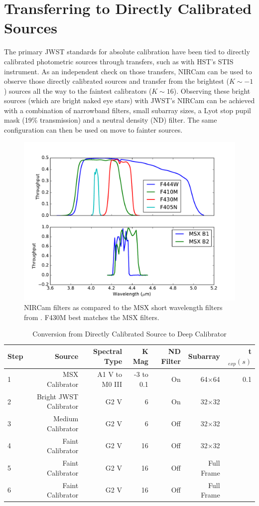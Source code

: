 \documentclass{aastex6}
\begin{document}
\clearpage
\section{Transferring to Directly Calibrated Sources}

The primary JWST standards for absolute calibration have been tied to directly calibrated photometric sources through transfers, such as with HST's STIS instrument.
As an independent check on those transfers, NIRCam can be used to observe those directly calibrated sources and transfer from the brightest ($K \sim -1$) sources all the way to the faintest calibrators ($K \sim 16$).
Observing these bright sources (which are bright naked eye stars) with JWST's NIRCam can be achieved with a combination of narrowband filters, small subarray sizes, a Lyot stop pupil mask (19\% transmission) and a neutral density (ND) filter.
The same configuration can then be used on move to fainter sources.

\begin{figure}[!hbtp]
\centering
\includegraphics[width=.4\columnwidth]{msx_nircam_filt.pdf}
\caption{NIRCam filters as compared to the MSX short wavelength filters from \citet{egan1999msxGuide}. F430M best matches the MSX filters.}\label{fig:NCFOV}
\end{figure}

\begin{table}
\centering
\caption{Conversion from Directly Calibrated Source to Deep Calibrator}\label{tab:clusterProp}
\begin{tabular}{lrrrrrr}
\hline \hline
Step		& Source						& Spectral Type	& K Mag		& ND Filter		& Subarray	& t$_{exp} (s) $\\
\hline \hline
1		& MSX Calibrator\tablenotemark{a}	& A1 V to M0 III		& -3 to 0.1		& On	&	64$\times$64	&  0.1 \\
2		& Bright JWST Calibrator			& G2 V			& 6	  		& On  &	32$\times$32	&   \\
3		& Medium Calibrator				& G2 V			& 6  			& Off &	32$\times$32	&   \\
4		& Faint Calibrator				& G2 V			& 16 			& Off &	32$\times$32	&   \\
5		& Faint Calibrator				& G2 V			& 16 			& Off &	Full Frame	&   \\
6		& Faint Calibrator				& G2 V			& 16 			& Off &	Full Frame  	&   \\
\hline
\end{tabular}
\vspace{0.05in}
\end{table}
\end{document}
